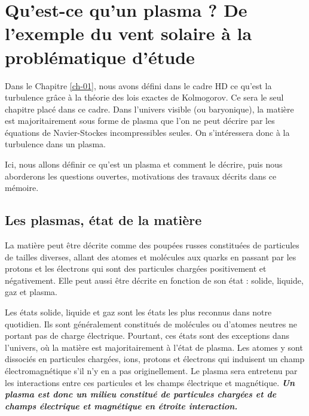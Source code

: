 \chapter{Qu'est-ce qu'un plasma ? De l'exemple du vent solaire à la problématique d'étude}
\renewcommand\partie{\Partie\ Chapitre \thechapter}
\label{ch-02}

\minitoc  

\bigskip

Dans le Chapitre \ref{ch-01}, nous avons défini dans le cadre HD ce qu'est la turbulence grâce à la théorie des lois exactes de Kolmogorov. Ce sera le seul chapitre placé dans ce cadre. Dans l'univers visible (ou baryonique), la matière est majoritairement sous forme de plasma que l'on ne peut décrire par les équations de Navier-Stockes incompressibles seules. On s'intéressera donc à la turbulence dans un plasma. 

Ici, nous allons définir ce qu'est un plasma et comment le décrire, puis nous aborderons les questions ouvertes, motivations des travaux décrits dans ce mémoire. 

\section{Les plasmas, état de la matière} \label{sec-021}

La matière peut être décrite comme des poupées russes constituées de particules de tailles diverses, allant des atomes et molécules aux quarks en passant par les protons et les électrons qui sont des particules chargées positivement et négativement. Elle peut aussi être décrite en fonction de son état : solide, liquide, gaz et plasma. 

Les états solide, liquide et gaz sont les états les plus reconnus dans notre quotidien. Ils sont généralement constitués de molécules ou d'atomes neutres ne portant pas de charge électrique. Pourtant, ces états sont des exceptions dans l'univers, où la matière est majoritairement à l'état de plasma. Les atomes y sont dissociés en particules chargées, ions, protons et électrons qui induisent un champ électromagnétique s'il n'y en a pas originellement. Le plasma sera entretenu par les interactions entre ces particules et les champs électrique et magnétique. \textbf{\emph{Un plasma est donc un milieu constitué de particules chargées et de champs électrique et magnétique en étroite interaction.}}

